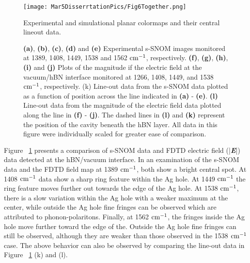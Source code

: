 \documentclass[
reprint,
amsmath,amssymb,
aip,
jap,
floatfix,
]{revtex4-2}
\begin{document}
      \begin{figure}[!htb]
        \centering\texttt{[image: Mar5DisserrtationPics/Fig6Together.png]}
        \caption{Experimental and simulational planar colormaps and their central lineout data.}
        \caption*{\textbf{(a)}, \textbf{(b)}, \textbf{(c)}, \textbf{(d)} and \textbf{(e)} Experimental s-SNOM images monitored at 1389, 1408, 1449, 1538 and 1562 $\rm cm^{-1}$, respectively. \textbf{(f)}, \textbf{(g)}, \textbf{(h)}, \textbf{(i)} and \textbf{(j)} Plots of the magnitude if the electric field at the vacuum/hBN interface monitored at 1266, 1408, 1449, and 1538 $\rm cm^{-1}$, respectively. (k) Line-out data from the s-SNOM data plotted as a function of position across the line indicated in \textbf{(a)} - \textbf{(e)}. \textbf{(l)}  Line-out data from the magnitude of the electric field data plotted along the line in \textbf{(f)} - \textbf{(j)}. The dashed lines in \textbf{(l)} and \textbf{(k)} represent the position of the cavity beneath the hBN layer. All data in this figure were individually scaled for greater ease of comparison.}
        \label{fig:6}
      \end{figure}

      Figure ~\ref{fig:6} presents a comparison of s-SNOM data and FDTD electric field (|\textbf{\textit{E}}|) data detected at the hBN/vacuum interface. In an examination of the s-SNOM data and the FDTD field map at 1389 $\rm cm^{-1}$, both show a bright central spot. At 1408 $\rm cm^{-1}$ data show a sharp ring feature within the Ag hole. At 1449 $\rm cm^{-1}$ the ring feature moves further out towards the edge of the Ag hole. At 1538 $\rm cm^{-1}$, there is a slow variation within the Ag hole with a weaker maximum at the center, while outside the Ag hole fine fringes can be observed which are attributed to phonon-polaritons. Finally, at 1562 $\rm cm^{-1}$, the fringes inside the Ag hole move further toward the edge of the. Outside the Ag hole fine fringes can still be observed, although they are weaker than those observed in the 1538 $\rm cm^{-1}$ case. The above behavior can also be observed by comparing the line-out data in Figure ~\ref{fig:6} (k) and (l).
\end{document}
